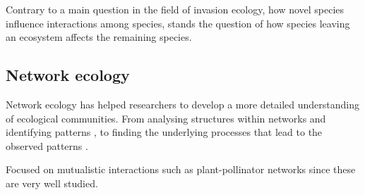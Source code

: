 \documentclass[12pt,a4paper]{article}
\begin{document}
Contrary to a main question in the field of invasion ecology, how novel species influence interactions among species, stands the question of how species leaving an ecosystem affects the remaining species. 


%
\subsection{Network ecology}
Network ecology has helped researchers to develop a more detailed understanding of ecological communities. From analysing structures within networks and identifying patterns \parencite{Jordano1987, Dunne2002}, %
to finding the underlying processes that lead to the observed patterns \parencite{Rezende2007, Vazquez2009, Thebault2010}.


Focused on mutualistic interactions such as plant-pollinator networks since these are very well studied.
\end{document}
